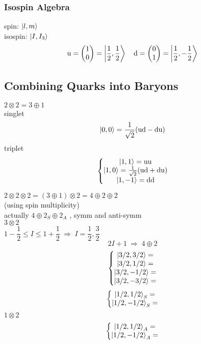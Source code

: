 \documentclass[a4paper]{article}
\DeclareMathOperator{\dra}{\;\Rightarrow\;}
\renewcommand{\u}{\mathrm{u}}
\renewcommand{\d}{\mathrm{d}}
\numberwithin{equation}{section}
\begin{document}
\subsubsection{Isospin Algebra}
spin: $ \ket{l,m} $\\
isospin: $ \ket{I, I_3} $\\
\begin{equation}\label{key}
\u = \mqty(1\\0) = \Ket{\dfrac{1}{2},\dfrac{1}{2}} \quad \d = \mqty(0\\1) = \Ket{\dfrac{1}{2}, -\dfrac{1}{2}}
\end{equation}

\subsection{Combining Quarks into Baryons}
$ 2\otimes 2 = 3\oplus 1 $\\
singlet
\begin{equation}\label{key}
\ket{0,0} = \dfrac{1}{\sqrt{2}}(\u\d - \d\u)
\end{equation}
triplet
\begin{equation}\label{key}
\left\{
\mqty{\ket{1,1} = \u\u\\
	  \ket{1,0} = \tfrac{1}{\sqrt{2}}(\u\d + \d\u)\\
	  \ket{1,-1} = \d\d
	 }
\right.
\end{equation}

$ 2\otimes 2\otimes 2  = (3\oplus 1)\otimes 2 = 4\oplus 2\oplus 2$\\
(using spin multiplicity)\\
actually $ 4\oplus 2_S\oplus 2_A$ , symm and anti-symm\\
$ 3\otimes 2 $\\
$ 1 - \dfrac{1}{2} \leq I \leq 1 + \dfrac{1}{2}  \dra I = \dfrac{1}{2}, \dfrac{3}{2}$\\
\begin{equation}\label{key}
2I+1 \dra 4\oplus 2
\end{equation}
\begin{equation}\label{key}
\left\{
\mqty{\ket{3/2, 3/2} = \\
	  \ket{3/2, 1/2} = \\
	  \ket{3/2, -1/2} = \\
	  \ket{3/2, -3/2} = 
     }
\right.
\end{equation}
\begin{equation}\label{key}
\left\{
\mqty{\ket{1/2, 1/2}_S = \\
	\ket{1/2, -1/2}_S = \\
     }
\right.
\end{equation}
$ 1\otimes 2 $
\begin{equation}\label{key}
\left\{
\mqty{\ket{1/2, 1/2}_A = \\
	\ket{1/2, -1/2}_A = \\
}
\right.
\end{equation}
\end{document}
